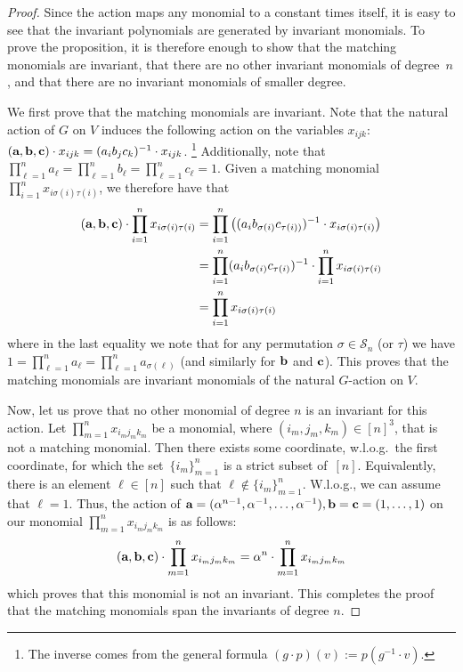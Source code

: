 \documentclass[10pt,a4paper]{article}
\newcommand{\ba}{\textbf a}
\newcommand{\bb}{\textbf b}
\newcommand{\bc}{\textbf c}
\begin{document}
\begin{proof}
  Since the action maps any monomial to a constant times itself, it is easy to see that the invariant polynomials are generated by invariant monomials.
	To prove the proposition, it is therefore enough to show that the matching monomials are invariant, that there are no other invariant monomials of degree~$n$, and that there are no invariant monomials of smaller degree.

  We first prove that the matching monomials are invariant.
	Note that the natural action of $G$ on $V$ induces the following action on the variables $x_{ijk}$:
	$(\ba, \bb, \bc) \cdot x_{ijk} = (a_i b_j c_k)^{-1} \cdot x_{ijk}$.
  \footnote{The inverse comes from the general formula $(g\cdot p)(v) := p(g^{-1} \cdot v)$. }
  Additionally, note that
	$\prod_{\ell=1}^n a_\ell = \prod_{\ell=1}^n b_\ell = \prod_{\ell=1}^n c_\ell = 1$. Given a
	matching monomial $\prod_{i =1}^n x_{i \sigma(i) \tau(i)}$, we therefore have that
	\begin{align*}
		(\ba, \bb, \bc) \cdot \prod_{i =1}^n x_{i \sigma(i) \tau(i)}
		& = \prod_{i =1}^n \left( (a_i b_{\sigma(i)} c_{\tau(i))})^{-1} \cdot x_{i \sigma(i) \tau(i)}  \right) \\
		& = \prod_{i=1}^n (a_i b_{\sigma(i)} c_{\tau(i)})^{-1}  \cdot
		\prod_{i =1}^n x_{i \sigma(i) \tau(i)} \\
		& = \prod_{i =1}^n x_{i \sigma(i) \tau(i)}
	\end{align*}
%
	where in the last equality we note that for any permutation $\sigma \in \mathcal{S}_n$ (or $\tau$)
	we have $1= \prod_{\ell=1}^n a_\ell = \prod_{\ell=1}^n a_{\sigma(\ell)}$ (and similarly for
	$\bb$ and $\bc$). This proves that the matching monomials are invariant monomials of the natural
	$G$-action on $V$.

	Now, let us prove that no other monomial of degree $n$ is an invariant for this action.
	Let $\prod_{m=1}^n x_{i_m j_m k_m}$ be a monomial, where $(i_m, j_m, k_m) \in [n]^3$, that is not a matching monomial.
	Then there exists some coordinate, w.l.o.g.\ the first coordinate, for which the set~$\{i_m\}_{m=1}^n$ is a strict subset of~$[n]$.
  Equivalently, there is an element $\ell \in [n]$ such that $\ell \not\in \{i_m\}_{m=1}^n$.
  W.l.o.g., we can assume that
	$\ell = 1$. Thus, the action of $\ba = (\alpha^{n-1}, \alpha^{-1}, \ldots, \alpha^{-1}),
	\bb = \bc = (1, \ldots, 1)$  on our monomial $\prod_{m=1}^n x_{i_m j_m k_m}$ is as follows:
	\begin{equation*}
		(\ba, \bb, \bc) \cdot \prod_{m=1}^n x_{i_m j_m k_m}
		= \alpha^n \cdot \prod_{m=1}^n x_{i_m j_m k_m}
	\end{equation*}
	which proves that this monomial is not an invariant.
  This completes the proof that the matching
	monomials span the invariants of degree $n$.


\end{proof}
\end{document}
